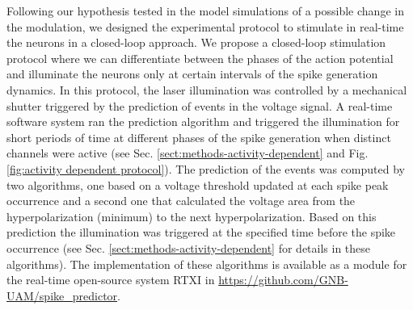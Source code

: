 Following our hypothesis tested in the model simulations of a possible change in the modulation, we designed the experimental protocol to stimulate in real-time the neurons in a closed-loop approach. We propose a closed-loop stimulation protocol where we can differentiate between the phases of the action potential and illuminate the neurons only at certain intervals of the spike generation dynamics. In this protocol, the laser illumination was controlled by a mechanical shutter triggered by the prediction of events in the voltage signal. A real-time software system ran the prediction algorithm and triggered the illumination for short periods of time at different phases of the spike generation when distinct channels were active (see Sec. \ref{sect:methods-activity-dependent} and Fig. \ref{fig:activity dependent protocol}). The prediction of the events was computed by two algorithms, one based on a voltage threshold updated at each spike peak occurrence and a second one that calculated the voltage area from the hyperpolarization (minimum) to the next hyperpolarization. Based on this prediction the illumination was triggered at the specified time before the spike occurrence (see Sec. \ref{sect:methods-activity-dependent} for details in these algorithms). The implementation of these algorithms is available as a module for the real-time open-source system RTXI \parencite{patel_hard_2017} in \href{github.com/GNB-UAM/spike_predictor}{https://github.com/GNB-UAM/spike\_predictor}.

